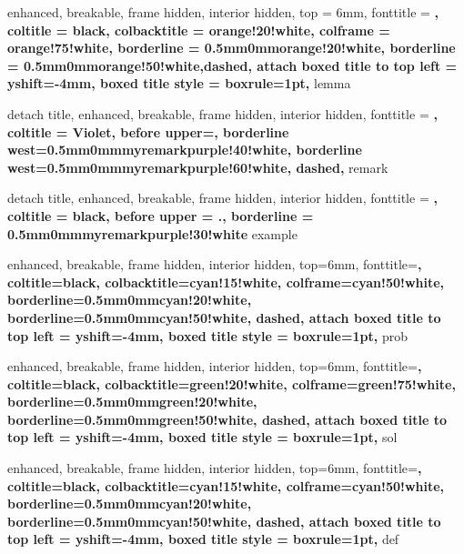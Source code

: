 {%
  enhanced,
  breakable,
  frame hidden,
  interior hidden,
  top = 6mm,
  fonttitle = \bfseries,
  coltitle = black,
  colbacktitle = orange!20!white,
  colframe = orange!75!white,
  borderline = {0.5mm}{0mm}{orange!20!white},
  borderline = {0.5mm}{0mm}{orange!50!white,dashed},
  attach boxed title to top left = {yshift=-4mm},
  boxed title style = {boxrule=1pt},
}{lemma}

{%
  detach title, 
  enhanced,
  breakable,
  frame hidden,
  interior hidden,
  fonttitle = \bfseries,
  coltitle = Violet, 
  before upper={\tcbtitle\quad},
  borderline west={0.5mm}{0mm}{myremarkpurple!40!white},
  borderline west={0.5mm}{0mm}{myremarkpurple!60!white, dashed},
}{remark}

%
{%
  detach title, 
  enhanced,
  breakable,
  frame hidden, 
  interior hidden, 
  fonttitle = \bfseries, 
  coltitle = black, 
  before upper = {\tcbtitle.\quad},
	borderline = {0.5mm}{0mm}{myremarkpurple!30!white}
}{example}

\renewenvironment{proof}[1][\proofname]{\textbf{\textit{#1.}}}{\qed}

{%
  enhanced,
  breakable,
  frame hidden,
  interior hidden,
  top=6mm,
  fonttitle=\bfseries,
  coltitle=black,
  colbacktitle=cyan!15!white,
  colframe=cyan!50!white,
  borderline={0.5mm}{0mm}{cyan!20!white},
  borderline={0.5mm}{0mm}{cyan!50!white, dashed},
  attach boxed title to top left = {yshift=-4mm},
  boxed title style = {boxrule=1pt}, 
}{prob}
\makeatletter
\newcommand\tcb@cnt@problemautorefname{Problem}
\makeatother

{%
  enhanced,
  breakable,
  frame hidden,
  interior hidden,
  top=6mm,
  fonttitle=\bfseries,
  coltitle=black,
  colbacktitle=green!20!white,
  colframe=green!75!white,
  borderline={0.5mm}{0mm}{green!20!white},
  borderline={0.5mm}{0mm}{green!50!white, dashed},
  attach boxed title to top left = {yshift=-4mm},
  boxed title style = {boxrule=1pt},
}{sol}

{%
  enhanced,
  breakable,
  frame hidden,
  interior hidden,
  top=6mm,
  fonttitle=\bfseries,
  coltitle=black,
  colbacktitle=cyan!15!white,
  colframe=cyan!50!white,
  borderline={0.5mm}{0mm}{cyan!20!white},
  borderline={0.5mm}{0mm}{cyan!50!white, dashed},
  attach boxed title to top left = {yshift=-4mm},
  boxed title style = {boxrule=1pt}, 
}{def}

